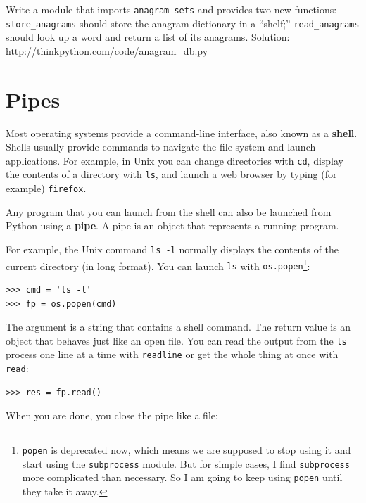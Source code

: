 \documentclass[10pt]{book}
\begin{document}
\begin{CJK}{UTF8}{gbsn}
\begin{exercise}
Write a module that imports \verb"anagram_sets" and provides
two new functions: \verb"store_anagrams" should store the
anagram dictionary in a ``shelf;'' \verb"read_anagrams" should
look up a word and return a list of its anagrams.
Solution: \url{http://thinkpython.com/code/anagram_db.py}

\end{exercise}


\section{Pipes}

Most operating systems provide a command-line interface,
also known as a {\bf shell}.  Shells usually provide commands
to navigate the file system and launch applications.  For
example, in Unix you can change directories with {\tt cd},
display the contents of a directory with {\tt ls}, and launch
a web browser by typing (for example) {\tt firefox}.

Any program that you can launch from the shell can also be
launched from Python using a {\bf pipe}.  A pipe is an object
that represents a running program.

For example, the Unix command {\tt ls -l} normally displays the
contents of the current directory (in long format).  You can
launch {\tt ls} with {\tt os.popen}\footnote{{\tt popen} is deprecated
now, which means we are supposed to stop using it and start using
the {\tt subprocess} module.  But for simple cases, I find
{\tt subprocess} more complicated than necessary.  So I am going
to keep using {\tt popen} until they take it away.}:

\begin{verbatim}
>>> cmd = 'ls -l'
>>> fp = os.popen(cmd)
\end{verbatim}
%
The argument is a string that contains a shell command.  The
return value is an object that behaves just like an open
file.  You can read the output from the {\tt ls} process one
line at a time with {\tt readline} or get the whole thing at
once with {\tt read}:

\begin{verbatim}
>>> res = fp.read()
\end{verbatim}
%
When you are done, you close the pipe like a file:


\end{CJK}
\end{document}

